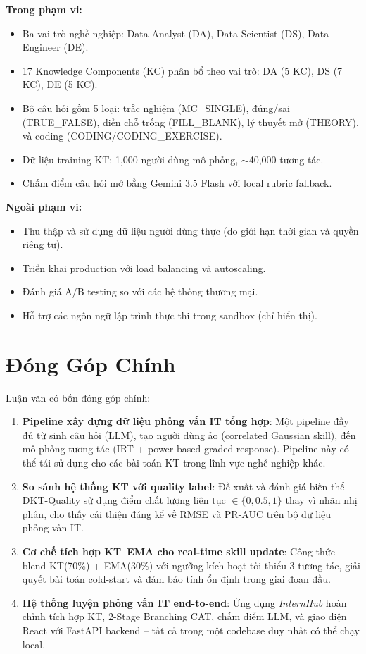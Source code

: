 \documentclass[12pt, a4paper]{report}
\newcommand{\system}{\textit{InternHub}}
\begin{document}
\textbf{Trong phạm vi:}
\begin{itemize}
  \item Ba vai trò nghề nghiệp: Data Analyst (DA), Data Scientist (DS), Data Engineer (DE).
  \item 17 Knowledge Components (KC) phân bổ theo vai trò: DA (5 KC), DS (7 KC), DE (5 KC).
  \item Bộ câu hỏi gồm 5 loại: trắc nghiệm (MC\_SINGLE), đúng/sai (TRUE\_FALSE), điền chỗ trống (FILL\_BLANK), lý thuyết mở (THEORY), và coding (CODING/CODING\_EXERCISE).
  \item Dữ liệu training KT: 1{,}000 người dùng mô phỏng, $\sim$40{,}000 tương tác.
  \item Chấm điểm câu hỏi mở bằng Gemini 3.5 Flash với local rubric fallback.
\end{itemize}

\textbf{Ngoài phạm vi:}
\begin{itemize}
  \item Thu thập và sử dụng dữ liệu người dùng thực (do giới hạn thời gian và quyền riêng tư).
  \item Triển khai production với load balancing và autoscaling.
  \item Đánh giá A/B testing so với các hệ thống thương mại.
  \item Hỗ trợ các ngôn ngữ lập trình thực thi trong sandbox (chỉ hiển thị).
\end{itemize}

\section{Đóng Góp Chính}
\label{sec:contributions}

Luận văn có bốn đóng góp chính:

\begin{enumerate}
  \item \textbf{Pipeline xây dựng dữ liệu phỏng vấn IT tổng hợp}: Một pipeline đầy đủ từ sinh câu hỏi (LLM), tạo người dùng ảo (correlated Gaussian skill), đến mô phỏng tương tác (IRT + power-based graded response). Pipeline này có thể tái sử dụng cho các bài toán KT trong lĩnh vực nghề nghiệp khác.

  \item \textbf{So sánh hệ thống KT với quality label}: Đề xuất và đánh giá biến thể DKT-Quality sử dụng điểm chất lượng liên tục $\in \{0, 0.5, 1\}$ thay vì nhãn nhị phân, cho thấy cải thiện đáng kể về RMSE và PR-AUC trên bộ dữ liệu phỏng vấn IT.

  \item \textbf{Cơ chế tích hợp KT--EMA cho real-time skill update}: Công thức blend KT(70\%) + EMA(30\%) với ngưỡng kích hoạt tối thiểu 3 tương tác, giải quyết bài toán cold-start và đảm bảo tính ổn định trong giai đoạn đầu.

  \item \textbf{Hệ thống luyện phỏng vấn IT end-to-end}: Ứng dụng \system{} hoàn chỉnh tích hợp KT, 2-Stage Branching CAT, chấm điểm LLM, và giao diện React với FastAPI backend -- tất cả trong một codebase duy nhất có thể chạy local.
\end{enumerate}
\end{document}
